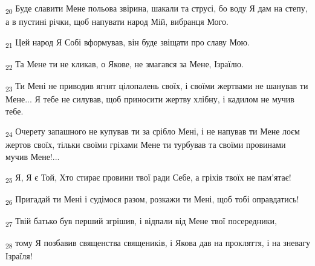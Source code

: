 \begin{tcolorbox}
\textsubscript{20} Буде славити Мене польова звірина, шакали та струсі, бо воду Я дам на степу, а в пустині річки, щоб напувати народ Мій, вибранця Мого.
\end{tcolorbox}
\begin{tcolorbox}
\textsubscript{21} Цей народ Я Собі вформував, він буде звіщати про славу Мою.
\end{tcolorbox}
\begin{tcolorbox}
\textsubscript{22} Та Мене ти не кликав, о Якове, не змагався за Мене, Ізраїлю.
\end{tcolorbox}
\begin{tcolorbox}
\textsubscript{23} Ти Мені не приводив ягнят цілопалень своїх, і своїми жертвами не шанував ти Мене... Я тебе не силував, щоб приносити жертву хлібну, і кадилом не мучив тебе.
\end{tcolorbox}
\begin{tcolorbox}
\textsubscript{24} Очерету запашного не купував ти за срібло Мені, і не напував ти Мене лоєм жертов своїх, тільки своїми гріхами Мене ти турбував та своїми провинами мучив Мене!...
\end{tcolorbox}
\begin{tcolorbox}
\textsubscript{25} Я, Я є Той, Хто стирає провини твої ради Себе, а гріхів твоїх не пам'ятає!
\end{tcolorbox}
\begin{tcolorbox}
\textsubscript{26} Пригадай ти Мені і судімося разом, розкажи ти Мені, щоб тобі оправдатись!
\end{tcolorbox}
\begin{tcolorbox}
\textsubscript{27} Твій батько був перший згрішив, і відпали від Мене твої посередники,
\end{tcolorbox}
\begin{tcolorbox}
\textsubscript{28} тому Я позбавив священства священиків, і Якова дав на прокляття, і на зневагу Ізраїля!
\end{tcolorbox}

